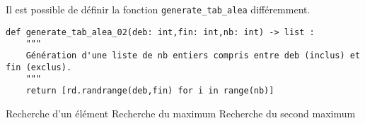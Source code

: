 Il est possible de définir la fonction \texttt{generate\_tab\_alea} différemment.
\begin{lstlisting}
def generate_tab_alea_02(deb: int,fin: int,nb: int) -> list :
    """
	Génération d'une liste de nb entiers compris entre deb (inclus) et fin (exclus).
    """
    return [rd.randrange(deb,fin) for i in range(nb)]

\end{lstlisting}


Recherche d'un élément 
Recherche du maximum
Recherche du second maximum
